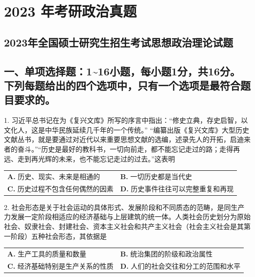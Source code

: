 \documentclass[UTF8,11pt]{ctexart}
\begin{document}
\section*{2023 年考研政治真题}
\subsection*{2023年全国硕士研究生招生考试思想政治理论试题}

\subsection*{一、单项选择题：1\textasciitilde{}16小题，每小题1分，共16分。下列每题给出的四个选项中，只有一个选项是最符合题目要求的。}

1. 习近平总书记在为《复兴文库》所写的序言中指出：“修史立典，存史启智，以文化人，这是中华民族延续几千年的一个传统。” “编纂出版《复兴文库》大型历史文献丛书，就是要通过对近代以来重要思想文献的选编，述录先人的开拓，启迪来者的奋斗。”“历史是最好的教科书，一切向前走，都不能忘记走过的路；走得再远、走到再光辉的未来，也不能忘记走过的过去。”这表明


\begin{center}\begin{tabular}{>{\raggedright\arraybackslash}p{\dimexpr(\linewidth-4\tabcolsep)/2\relax}>{\raggedright\arraybackslash}p{\dimexpr(\linewidth-4\tabcolsep)/2\relax}}
\textbf{A.} 历史、现实、未来是相通的 & \textbf{B.} 一切历史都是当代史\\[.35em]
\textbf{C.} 历史过程不包含任何偶然的因素 & \textbf{D.} 历史事件往往可以完整重复和再现\\[.35em]\end{tabular}\end{center}

2. 社会形态是关于社会运动的具体形式、发展阶段和不同质态的范畴，是同生产力发展一定阶段相适应的经济基础与上层建筑的统一体。人类社会历史划分为原始社会、奴隶社会、封建社会、资本主义社会和共产主义社会（社会主义社会是其第一阶段）五种社会形态，其依据是


\begin{center}\begin{tabular}{>{\raggedright\arraybackslash}p{\dimexpr(\linewidth-4\tabcolsep)/2\relax}>{\raggedright\arraybackslash}p{\dimexpr(\linewidth-4\tabcolsep)/2\relax}}
\textbf{A.} 生产工具的质量和数量 & \textbf{B.} 统治集团的阶级和政治属性\\[.35em]
\textbf{C.} 经济基础特别是生产关系的性质 & \textbf{D.} 人们的社会交往和分工的范围和水平\\[.35em]\end{tabular}\end{center}
\end{document}

